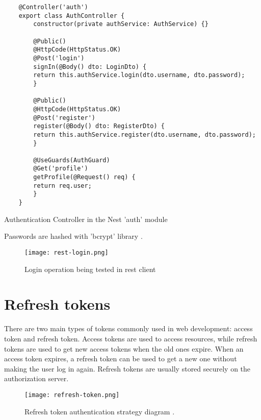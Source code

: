 \begin{listing}[H]
    \begin{verbatim}
    @Controller('auth')
    export class AuthController {
        constructor(private authService: AuthService) {}

        @Public()
        @HttpCode(HttpStatus.OK)
        @Post('login')
        signIn(@Body() dto: LoginDto) {
        return this.authService.login(dto.username, dto.password);
        }

        @Public()
        @HttpCode(HttpStatus.OK)
        @Post('register')
        register(@Body() dto: RegisterDto) {
        return this.authService.register(dto.username, dto.password);
        }

        @UseGuards(AuthGuard)
        @Get('profile')
        getProfile(@Request() req) {
        return req.user;
        }
    }
    \end{verbatim}
\caption[Authentication Controller in Nest module]{Authentication Controller in the Nest 'auth' module}
\end{listing}


Passwords are hashed with 'bcrypt' library \autocite{bcryptTemoye}.


\begin{figure}[H]
    \centering
    \texttt{[image: rest-login.png]}
    \caption[Login operation in rest client]{\label{fig:restlogin} Login operation being tested in rest client }
\end{figure}


\section{{Refresh tokens}}%
\label{sec:refreshtoken}

There are two main types of tokens commonly used in web development: access token and refresh token. Access tokens are used to access resources, while refresh tokens are used to get new access tokens when the old ones expire. When an access token expires, a refresh token can be used to get a new one without making the user log in again. Refresh tokens are usually stored securely on the authorization server.

\begin{figure}[H]
    \centering
    \texttt{[image: refresh-token.png]}
    \caption[Refresh token authentication strategy diagram ]{\label{fig:refreshtoken} Refresh token authentication strategy diagram \autocite{RoyRefreshToken}. }
\end{figure}

